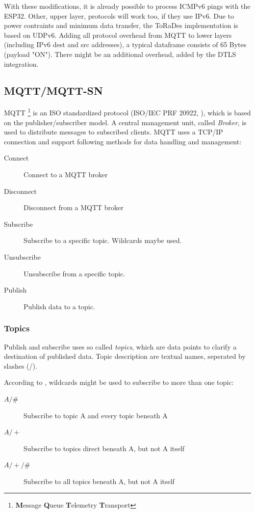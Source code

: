 \documentclass[]{scrreprt}%
\begin{document}

With these modifications, it is already possible to process ICMPv6 pings with the ESP32. Other, upper layer, protocols will work too, if they use IPv6.
Due to power contraints and minimum data transfer, the ToRaDes implementation is based on UDPv6. Adding all protocol overhead from MQTT to lower layers (including IPv6 dest and src addresses),
a typical dataframe consists of 65 Bytes (payload "ON").
There might be an additional overhead, added by the DTLS integration.

\subsection{MQTT/MQTT-SN}

MQTT \footnote{\textbf{M}essage \textbf{Q}ueue \textbf{T}elemetry \textbf{T}ransport} is an ISO standardized protocol (ISO/IEC PRF 20922, \cite{MQ01}), which is based on the publisher/subscriber model.
A central management unit, called \textit{Broker}, is used to distribute messages to subscribed clients. MQTT uses a TCP/IP connection and support following methods for data handling and management:

\begin{description}
 \item[Connect] Connect to a MQTT broker
 \item[Disconnect] Disconnect from a MQTT broker
 \item[Subscribe] Subscribe to a specific topic. Wildcards maybe used.
 \item[Unsubscribe] Unsubscribe from a specific topic.
 \item[Publish] Publish data to a topic.
\end{description}

\subsubsection{Topics}

Publish and subscribe uses so called \textit{topics}, which are data points to clarify a destination of published data.
Topic description are textual names, seperated by slashes (/).

According to \cite{GH01}, wildcards might be used to subscribe to more than one topic:

\begin{description}
 \item[$A/\#$] Subscribe to topic A and every topic beneath A
 \item[$A/+$] Subscribe to topics direct beneath A, but not A itself
 \item[$A/+/\#$] Subscribe to all topics beneath A, but not A itself
\end{description}
\end{document}
